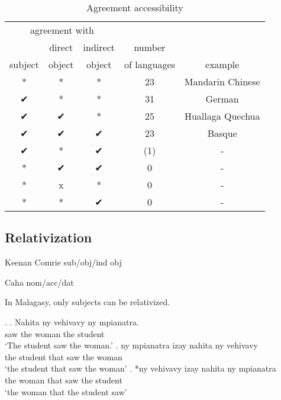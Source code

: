 \begin{table}[H]
  \center
  \caption {Agreement accessibility}
    \begin{tabular}[t]{ccccc}
      \toprule
            \multicolumn{3}{c}{agreement with}
            &
          & \\
      \cmidrule{1-3}
            & direct
            & indirect
            & number
          & \\
            subject
            & object
            & object
            & of languages
          & example \\
      \cmidrule{1-3} \cmidrule{4-4} \cmidrule{5-5}
            *
            & *
            & *
            & 23
          & Mandarin Chinese \\
            ✔
            & *
            & *
            & 31
          & German \\
            ✔
            & ✔
            & *
            & 25
          & Huallaga Quechua \\
            ✔
            & ✔
            & ✔
            & 23
          & Basque \\
            ✔
            & *
            & ✔
            & (1)
          & - \\
            {*}
            & ✔
            & ✔
            & 0
          & - \\
            {*}
            & x
            & *
            & 0
          & - \\
            {*}
            & *
            & ✔
            & 0
          & - \\
      \bottomrule
    \end{tabular}
\end{table}



\subsection{Relativization}

Keenan Comrie sub/obj/ind obj

Caha nom/acc/dat

In Malagasy, only subjects can be relativized.

\ex.
\ag. Nahita ny vehivavy ny mpianatra.\\
 saw the woman the student\\
 `The student saw the woman.'
\bg. ny mpianatra izay nahita ny vehivavy\\
 the student that saw the woman\\
 `the student that saw the woman'
\bg. *ny vehivavy izay nahita ny mpianatra\\
 the woman that saw the student\\
 `the woman that the student saw' 

